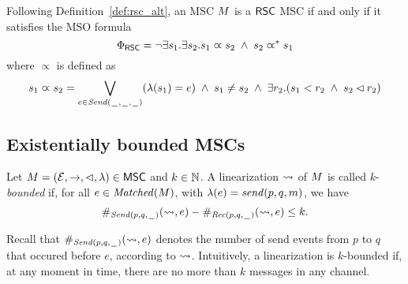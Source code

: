 Following Definition~\ref{def:rsc_alt}, an MSC $M$ is a $\mathsf{RSC}$ MSC if and only if it satisfies the MSO formula
\[
\Phi_{\mathsf{RSC}} = \neg \exists s_1.\exists s_2. s_1 \varpropto s_2 \;\wedge\; s_2 \varpropto^\ast s_1
\]
\noindent where $\varpropto$ is defined as
\[
s_1 \varpropto s_2 = 
\bigvee_{\substack{e \in {\mathit{Send}(\hspace{0.1em}\underline{\hspace{0.5em}}\hspace{0.1em},\hspace{0.1em}\underline{\hspace{0.5em}}\hspace{0.1em},\hspace{0.1em}\underline{\hspace{0.5em}}\hspace{0.1em})}}}(\lambda(s_1) = e) \;\wedge\;
s_1 \neq s_2 \;\wedge\; 
\exists r_2. (s_1 < r_2 \;\wedge\; s_2 \lhd r_2)
\]

\subsection{Existentially bounded MSCs}

\begin{definition}\label{def:lin_k_bounded}
	Let $M = (\mathcal{E},\to,\lhd,\lambda) \in \mathsf{MSC}$ and $k \in \mathbb{N}$.
	A linearization $\rightsquigarrow$ of $M$ is called
	$k$-\emph{bounded} if, for all $e \in \mathit{Matched}(M)$, with $\lambda(e) = \mathit{send}(p, q, m)$, we have 
	\[
	\#_{{\mathit{Send}(p,q,\hspace{0.1em}\underline{\hspace{0.5em}}\hspace{0.1em})}}(\rightsquigarrow,e) - \#_{{\mathit{Rec}(p,q,\hspace{0.1em}\underline{\hspace{0.5em}}\hspace{0.1em})}}(\rightsquigarrow,e) \le k.
	\]
\end{definition}
\noindent Recall that $\#_{{\mathit{Send}(p,q,\hspace{0.1em}\underline{\hspace{0.5em}}\hspace{0.1em})}}(\rightsquigarrow,e)$ denotes the number of send events from $p$ to $q$ that occured before $e$, according to $\rightsquigarrow$. Intuitively, a linearization is $k$-bounded if, at any moment in time, there are no more than $k$ messages in any channel.

